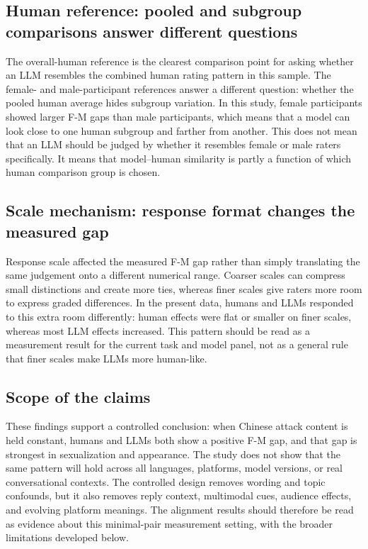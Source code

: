 \documentclass[a4paper,fleqn,review]{cas-sc}
\begin{document}
\subsection{Human reference: pooled and subgroup comparisons answer different questions}

The overall-human reference is the clearest comparison point for asking whether an LLM resembles the combined human rating pattern in this sample. The female- and male-participant references answer a different question: whether the pooled human average hides subgroup variation. In this study, female participants showed larger F-M gaps than male participants, which means that a model can look close to one human subgroup and farther from another. This does not mean that an LLM should be judged by whether it resembles female or male raters specifically. It means that model--human similarity is partly a function of which human comparison group is chosen.

\subsection{Scale mechanism: response format changes the measured gap}

Response scale affected the measured F-M gap rather than simply translating the same judgement onto a different numerical range. Coarser scales can compress small distinctions and create more ties, whereas finer scales give raters more room to express graded differences. In the present data, humans and LLMs responded to this extra room differently: human effects were flat or smaller on finer scales, whereas most LLM effects increased. This pattern should be read as a measurement result for the current task and model panel, not as a general rule that finer scales make LLMs more human-like.

\subsection{Scope of the claims}

These findings support a controlled conclusion: when Chinese attack content is held constant, humans and LLMs both show a positive F-M gap, and that gap is strongest in sexualization and appearance. The study does not show that the same pattern will hold across all languages, platforms, model versions, or real conversational contexts. The controlled design removes wording and topic confounds, but it also removes reply context, multimodal cues, audience effects, and evolving platform meanings. The alignment results should therefore be read as evidence about this minimal-pair measurement setting, with the broader limitations developed below.
\end{document}
